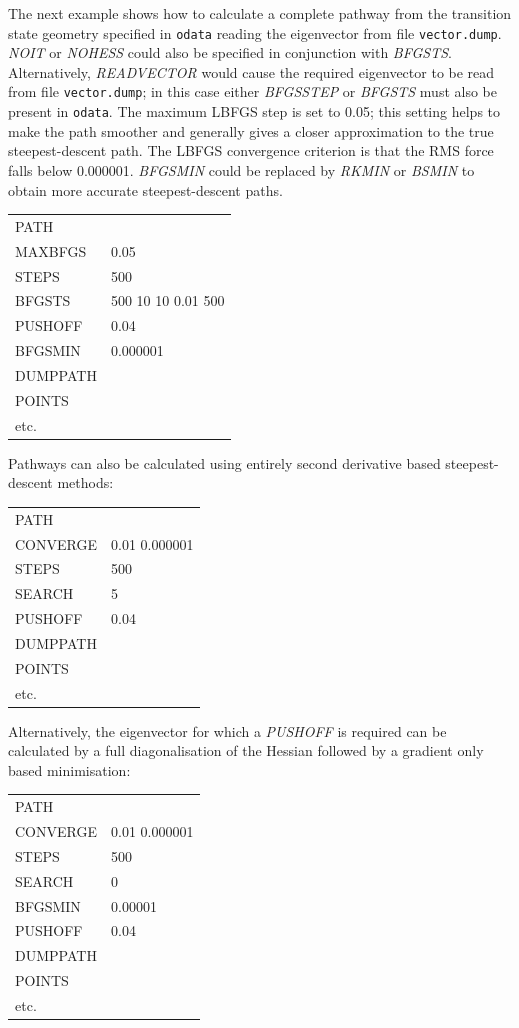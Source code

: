 \documentclass[12pt,a4paper,dvips]{article}
\begin{document}
\noindent The next example shows how to calculate a complete pathway from the transition state geometry
specified in {\tt odata} reading the eigenvector from file {\tt vector.dump}. 
{\it NOIT\/} or {\it NOHESS\/} could also be specified in conjunction with {\it BFGSTS\/}. 
Alternatively, {\it READVECTOR\/} would cause the required eigenvector to be read from 
file {\tt vector.dump}; in this case either {\it BFGSSTEP\/} or {\it BFGSTS\/} must
also be present in {\tt odata}.
The maximum LBFGS step is set to 0.05; this setting
helps to make the path smoother and generally gives a closer approximation to the true steepest-descent
path. The LBFGS convergence criterion is that the RMS force falls below 0.000001. {\it BFGSMIN\/}
could be replaced by {\it RKMIN\/} or {\it BSMIN\/} to obtain more accurate steepest-descent paths.

\medskip
\begin{tabular}{ll}
PATH & \\
MAXBFGS & 0.05 \\
STEPS & 500 \\
BFGSTS & 500 10 10 0.01 500 \\
PUSHOFF & 0.04 \\
BFGSMIN & 0.000001 \\
DUMPPATH \\
POINTS & \\
 etc. \\
\end{tabular}

\noindent Pathways can also be calculated using entirely second derivative based steepest-descent methods:

\medskip
\begin{tabular}{ll}
PATH &\\
CONVERGE& 0.01 0.000001\\
STEPS&  500\\
SEARCH& 5\\
PUSHOFF&  0.04 \\
DUMPPATH& \\
POINTS& \\
etc. & \\
\end{tabular}

\noindent Alternatively, the eigenvector for which a {\it PUSHOFF\/} is required can be calculated by a full
diagonalisation of the Hessian followed by a gradient only based minimisation:

\medskip
\begin{tabular}{ll}
PATH &\\
CONVERGE& 0.01 0.000001\\
STEPS&  500\\
SEARCH& 0\\
BFGSMIN & 0.00001 \\
PUSHOFF&  0.04 \\
DUMPPATH& \\
POINTS& \\
etc. & \\
\end{tabular}
\end{document}
